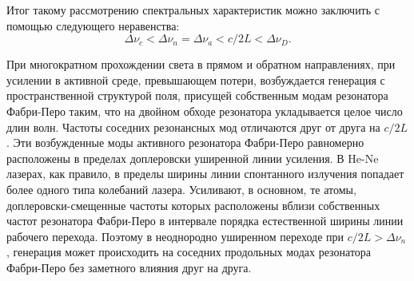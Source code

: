 \documentclass[12pt, russian, a4paper]{article}
\begin{document}
	Итог такому рассмотрению спектральных характеристик можно заключить с помощью следующего неравенства:
	\begin{equation}
		\Delta \nu_c < \Delta \nu_n = \Delta \nu_a < c/2L < \Delta \nu_D.
	\end{equation}

	При многократном прохождении света в прямом и обратном направлениях, при усилении в активной среде, превышающем потери, возбуждается генерация с пространственной структурой поля, присущей собственным модам резонатора Фабри-Перо таким, что на двойном обходе резонатора укладывается целое число длин волн. Частоты соседних резонансных мод отличаются друг от друга на $c/2L$. Эти возбужденные моды активного резонатора Фабри-Перо равномерно расположены в пределах доплеровски уширенной линии усиления. В He-Ne лазерах, как правило, в пределы ширины линии спонтанного излучения попадает более одного типа колебаний лазера. Усиливают, в основном, те атомы, доплеровски-смещенные частоты которых расположены вблизи собственных частот резонатора Фабри-Перо в интервале порядка естественной ширины линии рабочего перехода. Поэтому в неоднородно уширенном переходе при $c/2L > \Delta\nu_n$, генерация может происходить на соседних продольных модах резонатора Фабри-Перо без заметного влияния друг на друга.

 
\end{document}
